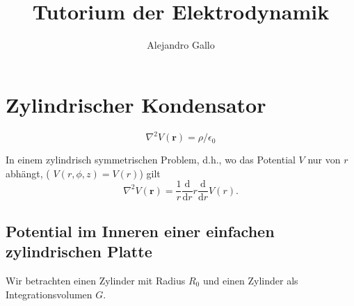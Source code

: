 \documentclass[A4paper, 12pt]{amsart}
\title{Tutorium der Elektrodynamik}
\author{Alejandro Gallo}
\begin{document}
\maketitle

\section{Zylindrischer Kondensator}

%
\begin{equation}
  \label{eq:gauss_theorem}
  \nabla ^{2} V(\mathbf{r}) = \rho / \epsilon_{0}
\end{equation}
%

In einem zylindrisch symmetrischen Problem, d.h., wo das Potential
$ V $ nur von $ r $ abhängt, ( $ V(r, \phi, z) = V(r) $) gilt
%
\begin{equation}
  \label{eq:laplacian_in_cylindrical_coordinates}
  \nabla ^{2} V(\mathbf{r}) =
  \frac{1}{r}
  \frac{\mathrm{d}}{\mathrm{d}r}
  r
  \frac{\mathrm{d}}{\mathrm{d}r}
  V(r)
  .
\end{equation}
%

\subsection{Potential im Inneren einer einfachen zylindrischen Platte}

Wir betrachten einen Zylinder mit Radius $ R_{0} $ und einen
Zylinder als Integrationsvolumen $ G $.

\begin{center}
  
\end{center}
\end{document}
